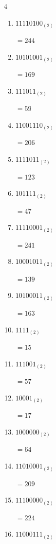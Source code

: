\begin{multicols}{4}
\begin{enumerate}
        $=171$

  \item $11110100_{(2)}$

        $=244$

  \item $10101001_{(2)}$

        $=169$

  \item $111011_{(2)}$

        $=59$

  \item $11001110_{(2)}$

        $=206$

  \item $1111011_{(2)}$

        $=123$

  \item $101111_{(2)}$

        $=47$

  \item $11110001_{(2)}$

        $=241$

  \item $10001011_{(2)}$

        $=139$

  \item $10100011_{(2)}$

        $=163$

  \item $1111_{(2)}$

        $=15$

\columnbreak %

  \item $111001_{(2)}$

        $=57$

  \item $10001_{(2)}$

        $=17$

  \item $1000000_{(2)}$

        $=64$

  \item $11010001_{(2)}$

        $=209$

  \item $11100000_{(2)}$

        $=224$

  \item $11000111_{(2)}$


\end{enumerate}
\end{multicols}
